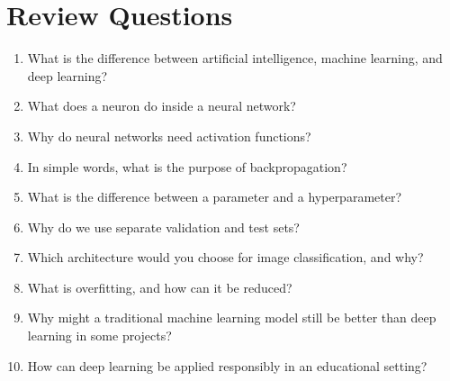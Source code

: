 \documentclass[11pt,a4paper]{article}
\begin{document}
\section{Review Questions}

\begin{enumerate}[leftmargin=*]
  \item What is the difference between artificial intelligence, machine learning, and deep learning?
  \item What does a neuron do inside a neural network?
  \item Why do neural networks need activation functions?
  \item In simple words, what is the purpose of backpropagation?
  \item What is the difference between a parameter and a hyperparameter?
  \item Why do we use separate validation and test sets?
  \item Which architecture would you choose for image classification, and why?
  \item What is overfitting, and how can it be reduced?
  \item Why might a traditional machine learning model still be better than deep learning in some projects?
  \item How can deep learning be applied responsibly in an educational setting?
\end{enumerate}
\end{document}
